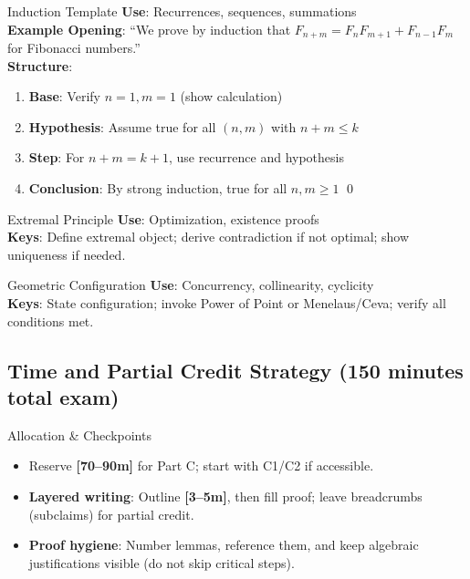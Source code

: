 \documentclass{article}
\newcommand{\timetarget}[1]{\textcolor{timingblue}{\textbf{[#1]}}}
\begin{document}
\begin{formalbox}{Induction Template}
\textbf{Use}: Recurrences, sequences, summations\\
\textbf{Example Opening}: ``We prove by induction that $F_{n+m} = F_n F_{m+1} + F_{n-1} F_m$ for Fibonacci numbers.''\\
\textbf{Structure}:
\begin{enumerate}[nosep]
\item \textbf{Base}: Verify $n=1, m=1$ (show calculation)
\item \textbf{Hypothesis}: Assume true for all $(n,m)$ with $n+m \leq k$
\item \textbf{Step}: For $n+m = k+1$, use recurrence and hypothesis
\item \textbf{Conclusion}: By strong induction, true for all $n,m \geq 1$ \qed
\end{enumerate}
\end{formalbox}

\begin{formalbox}{Extremal Principle}
\textbf{Use}: Optimization, existence proofs\\
\textbf{Keys}: Define extremal object; derive contradiction if not optimal; show uniqueness if needed.
\end{formalbox}

\begin{formalbox}{Geometric Configuration}
\textbf{Use}: Concurrency, collinearity, cyclicity\\
\textbf{Keys}: State configuration; invoke Power of Point or Menelaus/Ceva; verify all conditions met.
\end{formalbox}

\newpage

\subsection{Time and Partial Credit Strategy (150 minutes total exam)}
\begin{strategybox}{Allocation \& Checkpoints}
\begin{itemize}
    \item Reserve \timetarget{70--90m} for Part C; start with C1/C2 if accessible.
    \item \textbf{Layered writing}: Outline \timetarget{3--5m}, then fill proof; leave breadcrumbs (subclaims) for partial credit.
    \item \textbf{Proof hygiene}: Number lemmas, reference them, and keep algebraic justifications visible (do not skip critical steps).
\end{itemize}
\end{strategybox}
\end{document}
